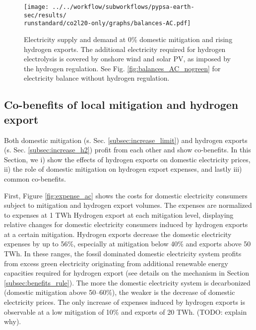 

\begin{figure}[h!]
    \centering
    \texttt{[image: ../../workflow/subworkflows/pypsa-earth-sec/results/\\runstandard/co2l20-only/graphs/balances-AC.pdf]}
    \caption{Electricity supply and demand at 0\% 
    domestic mitigation and rising hydrogen exports. The additional electricity required for hydrogen electrolysis is covered by onshore wind and solar PV, as imposed by the hydrogen regulation. See Fig. \ref{fig:balances_AC_nogreen} for electricity balance without hydrogen regulation.}
    \label{fig:balances-ac-co2l20}
\end{figure}


\subsection{Co-benefits of local mitigation and hydrogen export}
\label{subsec:benefits}

Both domestic mitigation (s. Sec. \ref{subsec:increase_limit}) and hydrogen exports (s. Sec. \ref{subsec:increase_h2}) profit from each other and show co-benefits. In this Section, we i) show the effects of hydrogen exports on domestic electricity prices, ii) the role of domestic mitigation on hydrogen export expenses, and lastly iii) common co-benefits.

First, Figure \ref{fig:expense_ac} shows the costs for domestic electricity consumers subject to mitigation and hydrogen export volumes. The expenses are normalized to expenses at 1 TWh Hydrogen export at each mitigation level, displaying relative changes for domestic electricity consumers induced by hydrogen exports at a certain mitigation.
Hydrogen exports decrease the domestic electricity expenses by up to 56\%, especially at mitigation below 40\% and exports above 50 TWh. In these ranges, the fossil dominated domestic electricity system profits from excess green electricity originating from additional renewable energy capacities required for hydrogen export (see details on the mechanism in Section \ref{subsec:benefits_rule}). The more the domestic electricity system is decarbonized (domestic mitigation above 50--60\%), the weaker is the decrease of domestic electricity prices.
The only increase of expenses induced by hydrogen exports is observable at a low mitigation of 10\% and exports of 20 TWh. (TODO: explain why).


